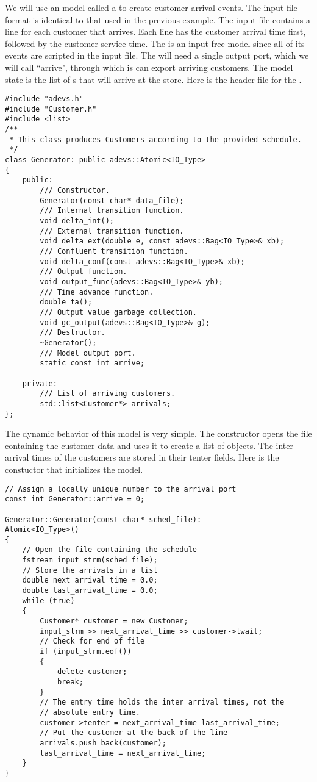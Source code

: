 We will use an  model called a  to create customer
arrival events. The input file format is identical to that used
in the previous example. The input file contains a line for each
customer that arrives. Each line has the customer arrival time first,
followed by the customer service time. The  is an input free
 model since all of its events are scripted in the input file.
The  will need a single output port, which we will call
``arrive", through which is can export arriving customers.
The model state is the list of s that will arrive at the store.
Here is the header file for the
.
\begin{verbatim}
#include "adevs.h"
#include "Customer.h"
#include <list>
/**
 * This class produces Customers according to the provided schedule.
 */
class Generator: public adevs::Atomic<IO_Type> 
{
    public:
        /// Constructor.
        Generator(const char* data_file);
        /// Internal transition function.
        void delta_int();
        /// External transition function.
        void delta_ext(double e, const adevs::Bag<IO_Type>& xb);
        /// Confluent transition function.
        void delta_conf(const adevs::Bag<IO_Type>& xb);
        /// Output function.  
        void output_func(adevs::Bag<IO_Type>& yb);
        /// Time advance function.
        double ta();
        /// Output value garbage collection.
        void gc_output(adevs::Bag<IO_Type>& g);
        /// Destructor.
        ~Generator();
        /// Model output port.
        static const int arrive;

    private:    
        /// List of arriving customers.
        std::list<Customer*> arrivals;
}; 
\end{verbatim}

The dynamic behavior of this model is very simple. The constructor
opens the file containing the customer data and uses it
to create a list of  objects. The inter-arrival times of the customers
are stored in their tenter fields. Here is the constuctor that initializes the model.
\begin{verbatim}
// Assign a locally unique number to the arrival port
const int Generator::arrive = 0;

Generator::Generator(const char* sched_file):
Atomic<IO_Type>()
{
    // Open the file containing the schedule
    fstream input_strm(sched_file);
    // Store the arrivals in a list
    double next_arrival_time = 0.0;
    double last_arrival_time = 0.0;
    while (true)
    {
        Customer* customer = new Customer;
        input_strm >> next_arrival_time >> customer->twait;
        // Check for end of file
        if (input_strm.eof())
        {
            delete customer;
            break;
        }
        // The entry time holds the inter arrival times, not the
        // absolute entry time.
        customer->tenter = next_arrival_time-last_arrival_time;
        // Put the customer at the back of the line
        arrivals.push_back(customer);
        last_arrival_time = next_arrival_time;
    }
}
\end{verbatim}

